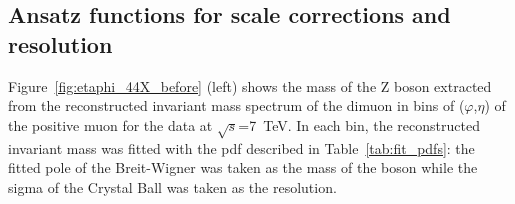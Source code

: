 \subsection{Ansatz functions for scale corrections and resolution}
Figure~\ref{fig:etaphi_44X_before} (left) shows the 
mass of the Z boson extracted from the reconstructed 
invariant mass spectrum of the dimuon in bins of
($\varphi$,$\eta$) of the positive muon for the data at
$\sqrt{s}$=7~TeV.
In each bin, the reconstructed invariant mass
was fitted with the pdf described in Table~\ref{tab:fit_pdfs}: 
the fitted pole of the Breit-Wigner was taken as the mass of the boson 
while the sigma of the Crystal Ball was taken as the resolution.

